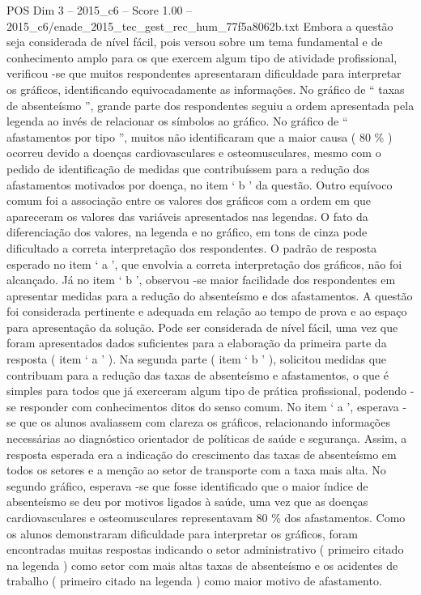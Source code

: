 \begin{textsample}{POS Dim 3 – 2015\_c6 – Score 1.00 – 2015\_c6/enade\_2015\_tec\_gest\_rec\_hum\_77f5a8062b.txt}
Embora a questão seja considerada de nível fácil, pois versou sobre um tema fundamental e de conhecimento amplo para os que exercem algum tipo de atividade profissional, verificou -se que muitos respondentes apresentaram dificuldade para interpretar os gráficos, identificando equivocadamente as informações.
No gráfico de “ taxas de absenteísmo ”, grande parte dos respondentes seguiu a ordem apresentada pela legenda ao invés de relacionar os símbolos ao gráfico.
No gráfico de “ afastamentos por tipo ”, muitos não identificaram que a maior causa ( 80 \% ) ocorreu devido a doenças cardiovasculares e osteomusculares, mesmo com o pedido de identificação de medidas que contribuíssem para a redução dos afastamentos motivados por doença, no item ‘ b ’ da questão.
Outro equívoco comum foi a associação entre os valores dos gráficos com a ordem em que apareceram os valores das variáveis apresentados nas legendas.
O fato da diferenciação dos valores, na legenda e no gráfico, em tons de cinza pode dificultado a correta interpretação dos respondentes.
O padrão de resposta esperado no item ‘ a ’, que envolvia a correta interpretação dos gráficos, não foi alcançado.
Já no item ‘ b ’, observou -se maior facilidade dos respondentes em apresentar medidas para a redução do absenteísmo e dos afastamentos.
A questão foi considerada pertinente e adequada em relação ao tempo de prova e ao espaço para apresentação da solução.
Pode ser considerada de nível fácil, uma vez que foram apresentados dados suficientes para a elaboração da primeira parte da resposta ( item ‘ a ’ ).
Na segunda parte ( item ‘ b ’ ), solicitou medidas que contribuam para a redução das taxas de absenteísmo e afastamentos, o que é simples para todos que já exerceram algum tipo de prática profissional, podendo -se responder com conhecimentos ditos do senso comum.
No item ‘ a ’, esperava -se que os alunos avaliassem com clareza os gráficos, relacionando informações necessárias ao diagnóstico orientador de políticas de saúde e segurança.
Assim, a resposta esperada era a indicação do crescimento das taxas de absenteísmo em todos os setores e a menção ao setor de transporte com a taxa mais alta.
No segundo gráfico, esperava -se que fosse identificado que o maior índice de absenteísmo se deu por motivos ligados à saúde, uma vez que as doenças cardiovasculares e osteomusculares representavam 80 \% dos afastamentos.
Como os alunos demonstraram dificuldade para interpretar os gráficos, foram encontradas muitas respostas indicando o setor administrativo ( primeiro citado na legenda ) como setor com mais altas taxas de absenteísmo e os acidentes de trabalho ( primeiro citado na legenda ) como maior motivo de afastamento.

\end{textsample}
